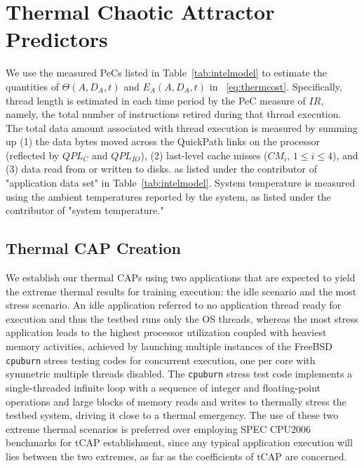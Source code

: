 \section{Thermal Chaotic Attractor Predictors}
\label{sec:therm-chaot-attr} 
We use the measured PeCs listed in Table~\ref{tab:intelmodel} to
estimate the quantities of $\Theta(A, D_{A}, t)$ and $E_{A}(A, D_{A},
t)$ in \equationname~\eqref{eq:thermcost}.  Specifically, thread length
is estimated in each time period by the PeC measure of $IR$, namely, the
total number of instructions retired during that thread execution.  The
total data amount associated with thread execution is measured by
summing up (1) the data bytes moved across the QuickPath links on the
processor (reflected by $QPL_{C}$ and $QPL_{IO}$), (2) last-level cache
misses ($CM_{i}$, $1\leq i \leq 4$), and (3) data read from or written
to disks.  as listed under the contributor of "application data set" in
Table~\ref{tab:intelmodel}.  System temperature is measured using the
ambient temperatures reported by the system, as listed under the
contributor of "system temperature."

\subsection{Thermal CAP Creation}
\label{sec:therm-calibrate}
We establish our thermal CAPs using two applications that are expected
to yield the extreme thermal results for training execution: the idle
scenario and the most stress scenario.  An idle application referred to
no application thread ready for execution and thus the testbed runs only
the OS threads, whereas the most stress application leads to the highest
processor utilization coupled with heaviest memory activities, achieved
by launching multiple instances of the FreeBSD \texttt{cpuburn} stress
testing codes for concurrent execution, one per core with symmetric
multiple threads disabled.  The \texttt{cpuburn} stress test code
implements a single-threaded infinite loop with a sequence of integer
and floating-point operations and large blocks of memory reads and
writes to thermally stress the testbed system, driving it close to a
thermal emergency.  The use of these two extreme thermal scenarios is
preferred over employing SPEC CPU2006 benchmarks for tCAP establishment,
since any typical application execution will lies between the two
extremes, as far as the coefficients of tCAP are concerned.

